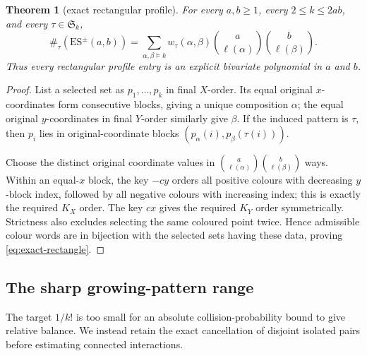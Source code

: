 \documentclass[11pt,letterpaper]{article}
\newtheorem{theorem}{Theorem}[section]
\newcommand{\Ssym}{\mathfrak S}
\begin{document}
\begin{theorem}[exact rectangular profile]\label{thm:exact-rectangle}
For every $a,b\geq1$, every $2\leq k\leq2ab$, and every
$\tau\in\Ssym_k$,
\begin{equation}\label{eq:exact-rectangle}
 \#_\tau(\mathrm{ES}^{\pm}(a,b))
 =\sum_{\alpha,\beta\vDash k}
   w_\tau(\alpha,\beta)
   \binom a{\ell(\alpha)}\binom b{\ell(\beta)}.
\end{equation}
Thus every rectangular profile entry is an explicit bivariate polynomial
in $a$ and $b$.
\end{theorem}

\begin{proof}
List a selected set as $p_1,\ldots,p_k$ in final $X$-order.  Its equal
original $x$-coordinates form consecutive blocks, giving a unique
composition $\alpha$; the equal original $y$-coordinates in final
$Y$-order similarly give $\beta$.  If the induced pattern is $\tau$,
then $p_i$ lies in original-coordinate blocks
$(p_\alpha(i),p_\beta(\tau(i)))$.

Choose the distinct original coordinate values in
$\binom a{\ell(\alpha)}\binom b{\ell(\beta)}$ ways.  Within an equal-$x$
block, the key $-cy$ orders all positive colours with decreasing
$y$-block index, followed by all negative colours with increasing index;
this is exactly the required $K_X$ order. The key $cx$ gives the
required $K_Y$ order symmetrically.  Strictness also excludes selecting
the same coloured point twice.  Hence admissible colour words are in
bijection with the selected sets having these data, proving
\eqref{eq:exact-rectangle}.

\end{proof}

\subsection{The sharp growing-pattern range}

The target $1/k!$ is too small for an absolute collision-probability bound
to give relative balance. We instead retain the exact cancellation of
disjoint isolated pairs before estimating connected interactions.
\end{document}
